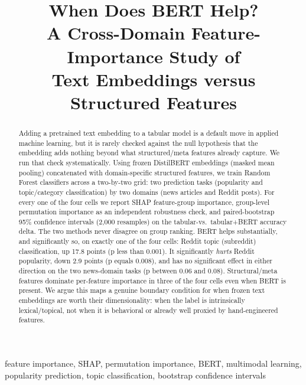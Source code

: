 \documentclass[conference]{IEEEtran}
\begin{document}
\title{When Does BERT Help?\\
A Cross-Domain Feature-Importance Study of\\
Text Embeddings versus Structured Features}

\author{
}

\maketitle

\begin{abstract}
Adding a pretrained text embedding to a tabular model is a default move in applied machine learning, but it is rarely checked against the null hypothesis that the embedding adds nothing beyond what structured/meta features already capture. We run that check systematically. Using frozen DistilBERT embeddings (masked mean pooling) concatenated with domain-specific structured features, we train Random Forest classifiers across a two-by-two grid: two prediction tasks (popularity and topic/category classification) by two domains (news articles and Reddit posts). For every one of the four cells we report SHAP feature-group importance, group-level permutation importance as an independent robustness check, and paired-bootstrap 95\% confidence intervals (2,000 resamples) on the tabular-vs.\ tabular+BERT accuracy delta. The two methods never disagree on group ranking. BERT helps substantially, and significantly so, on exactly one of the four cells: Reddit topic (subreddit) classification, up 17.8 points (p less than 0.001). It significantly \emph{hurts} Reddit popularity, down 2.9 points (p equals 0.008), and has no significant effect in either direction on the two news-domain tasks (p between 0.06 and 0.08). Structural/meta features dominate per-feature importance in three of the four cells even when BERT is present. We argue this maps a genuine boundary condition for when frozen text embeddings are worth their dimensionality: when the label is intrinsically lexical/topical, not when it is behavioral or already well proxied by hand-engineered features.
\end{abstract}

\begin{IEEEkeywords}
feature importance, SHAP, permutation importance, BERT, multimodal learning, popularity prediction, topic classification, bootstrap confidence intervals
\end{IEEEkeywords}
\end{document}
